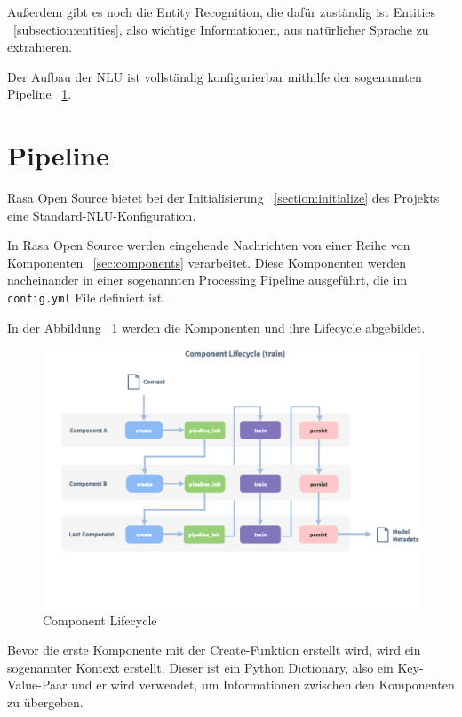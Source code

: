 Außerdem gibt es noch die Entity Recognition, die dafür zuständig ist Entities ~\ref{subsection:entities}, also wichtige Informationen, aus natürlicher Sprache zu extrahieren.\cite{rasanlu}

Der Aufbau der NLU ist vollständig konfigurierbar mithilfe der sogenannten Pipeline ~\ref{sec:pipeline}.\cite{howToChooseAPipeline}

\section{Pipeline}\label{sec:pipeline}

Rasa Open Source bietet bei der Initialisierung ~\ref{section:initialize} des Projekts eine Standard-NLU-Konfiguration.\cite{tuningYourModel}

In Rasa Open Source werden eingehende Nachrichten von einer Reihe von Komponenten ~\ref{sec:components} verarbeitet.
Diese Komponenten werden nacheinander in einer sogenannten Processing Pipeline ausgeführt, die im \texttt{config.yml} File definiert ist.\cite{howToChooseAPipeline}

In der Abbildung ~\ref{fig:component_lifecycle} werden die Komponenten und ihre Lifecycle abgebildet.

\begin{figure}[hbt!]
    \centering
    \includegraphics[scale=0.25]{pics/component-lifecycle}
    \caption{Component Lifecycle~\cite{componentLifecycle}}
    \label{fig:component_lifecycle}
\end{figure}

Bevor die erste Komponente mit der Create-Funktion erstellt wird, wird ein sogenannter Kontext erstellt.
Dieser ist ein Python Dictionary, also ein Key-Value-Paar und er wird verwendet, um Informationen zwischen den Komponenten zu übergeben.\cite{componentLifecycle, componentLifecycleDoc}

